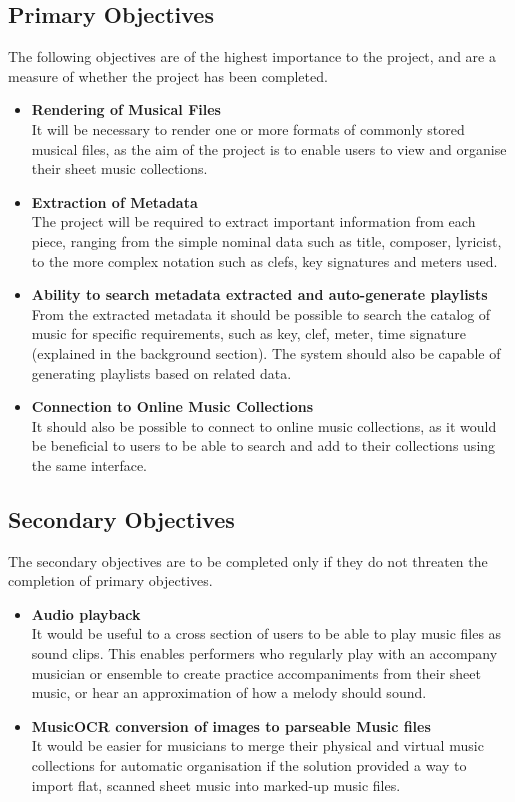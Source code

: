 \subsection{Primary Objectives}
The following objectives are of the highest importance to the project, and are a measure of whether the project has been completed.
\begin{itemize}
    \item \textbf{Rendering of Musical Files}\\
    It will be necessary to render one or more formats of commonly stored musical files, as the aim of the project is to enable users to view and organise their sheet music collections.
    \item \textbf{Extraction of Metadata}\\
    The project will be required to extract important information from each piece, ranging from the simple nominal data such as title, composer, lyricist, to the more complex notation such as clefs, key signatures and meters used. 
    \item \textbf{Ability to search metadata extracted and auto-generate playlists}\\ From the extracted metadata it should be possible to search the catalog of music for specific requirements, such as key, clef, meter, time signature (explained in the background section). The system should also be capable of generating playlists based on related data.
    \item \textbf{Connection to Online Music Collections}\\
    It should also be possible to connect to online music collections, as it would be beneficial to users to be able to search and add to their collections using the same interface.

\end{itemize}
\subsection{Secondary Objectives}
The secondary objectives are to be completed only if they do not threaten the completion of primary objectives.

\begin{itemize}
    \item \textbf{Audio playback}\\
    It would be useful to a cross section of users to be able to play music files as sound clips. This enables performers who regularly play with an accompany musician or ensemble to create practice accompaniments from their sheet music, or hear an approximation of how a melody should sound.
    \item \textbf{MusicOCR conversion of images to parseable Music files}\\
It would be easier for musicians to merge their physical and virtual music collections for automatic organisation if the solution provided a way to import flat, scanned sheet music into marked-up music files. 
\end{itemize}
